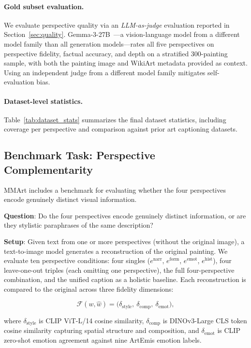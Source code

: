 \paragraph{Gold subset evaluation.}
We evaluate perspective quality via an \textit{LLM-as-judge} evaluation reported in Section~\ref{sec:quality}.
Gemma-3-27B~\cite{gemmateam2025gemma3technicalreport}---a vision-language model from a different model family than all generation models---rates all five perspectives on perspective fidelity, factual accuracy, and depth on a stratified 300-painting sample, with both the painting image and WikiArt metadata provided as context.
Using an independent judge from a different model family mitigates self-evaluation bias.

\paragraph{Dataset-level statistics.}
Table~\ref{tab:dataset_stats} summarizes the final dataset statistics, including coverage per perspective and comparison against prior art captioning datasets.


\subsection{Benchmark Task: Perspective Complementarity}

MMArt includes a benchmark for evaluating whether the four perspectives encode genuinely distinct visual information.

\textbf{Question}: Do the four perspectives encode genuinely distinct information, or are they stylistic paraphrases of the same description?

\textbf{Setup}: Given text from one or more perspectives (without the original image), a text-to-image model generates a reconstruction of the original painting.
We evaluate ten perspective conditions: four singles ($e^{\text{narr}}$, $e^{\text{form}}$, $e^{\text{emot}}$, $e^{\text{hist}}$), four leave-one-out triples (each omitting one perspective), the full four-perspective combination, and the unified caption as a holistic baseline.
Each reconstruction is compared to the original across three fidelity dimensions:

\begin{equation}
\mathcal{F}(w, \hat{w}) = \bigl(\delta_{\text{style}},\ \delta_{\text{comp}},\ \delta_{\text{emot}}\bigr),
\end{equation}

where $\delta_{\text{style}}$ is CLIP ViT-L/14 cosine similarity, $\delta_{\text{comp}}$ is DINOv3-Large CLS token cosine similarity capturing spatial structure and composition, and $\delta_{\text{emot}}$ is CLIP zero-shot emotion agreement against nine ArtEmis emotion labels.


